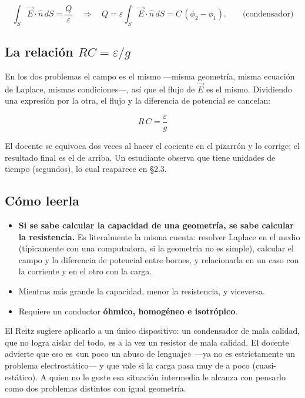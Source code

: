 \documentclass[12pt,a4paper]{article}
\begin{document}
\[
\int_S \vec E\cdot\hat n\,dS = \frac{Q}{\varepsilon}
\quad\Longrightarrow\quad
Q = \varepsilon\int_S \vec E\cdot\hat n\,dS = C\,(\phi_2-\phi_1) .
\qquad\text{(condensador)}
\]

\subsection{La relación \texorpdfstring{$RC = \varepsilon/g$}{RC = epsilon/g}}

En los dos problemas el campo es el mismo ---misma geometría, misma ecuación de
Laplace, mismas condiciones---, así que el flujo de $\vec E$ es el mismo.
Dividiendo una expresión por la otra, el flujo y la diferencia de potencial se
cancelan:

\begin{keybox}
\[
\boxed{\ R\,C = \frac{\varepsilon}{g}\ }
\]
\end{keybox}

\begin{notebox}
El docente se equivoca dos veces al hacer el cociente en el pizarrón y lo
corrige; el resultado final es el de arriba. Un estudiante observa que tiene
unidades de tiempo (segundos), lo cual reaparece en §2.3.
\end{notebox}

\subsection{Cómo leerla}

\begin{itemize}
  \item \textbf{Si se sabe calcular la capacidad de una geometría, se sabe calcular la
  resistencia.} Es literalmente la misma cuenta: resolver Laplace en el medio
  (típicamente con una computadora, si la geometría no es simple), calcular el
  campo y la diferencia de potencial entre bornes, y relacionarla en un caso
  con la corriente y en el otro con la carga.
  \item Mientras más grande la capacidad, menor la resistencia, y viceversa.
  \item Requiere un conductor \textbf{óhmico, homogéneo e isotrópico}.
\end{itemize}

\begin{notebox}
El Reitz sugiere aplicarlo a un
único dispositivo: un condensador de mala calidad, que no logra aislar del
todo, es a la vez un resistor de mala calidad. El docente advierte que eso es
«un poco un abuso de lenguaje» ---ya no es estrictamente un problema
electrostático--- y que vale si la carga pasa muy de a poco (cuasi-estático). A
quien no le guste esa situación intermedia le alcanza con pensarlo como dos
problemas distintos con igual geometría.
\end{notebox}
\end{document}
